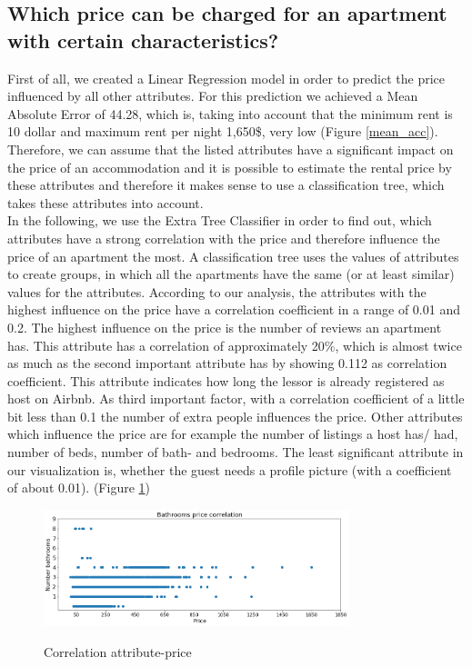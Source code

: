 \documentclass[journal]{IEEEtran}
\begin{document}
\subsection{Which price can be charged for an apartment with certain characteristics?}
First of all, we created a Linear Regression model in order to predict the price influenced by all other attributes. For this prediction we achieved a Mean Absolute Error of 44.28, which is, taking into account that the minimum rent is 10 dollar and maximum rent per night 1,650\$, very low (Figure \ref{mean_acc}). Therefore, we can assume that the listed attributes have a significant impact on the price of an accommodation and it is possible to estimate the rental price by these attributes and therefore it makes sense to use a classification tree, which takes these attributes into account.\\ In the following, we use the Extra Tree Classifier in order to find out, which attributes have a strong correlation with the price and therefore influence the price of an apartment the most. A classification tree uses the values of attributes to create groups, in which all the apartments have the same (or at least similar) values for the attributes. According to our analysis, the attributes with the highest influence on the price have a correlation coefficient in a range of 0.01 and 0.2. The highest influence on the price is the number of reviews an apartment has. This attribute has a correlation of approximately 20\%, which is almost twice as much as the second important attribute has by showing 0.112 as correlation coefficient. This attribute indicates how long the lessor is already registered as host on Airbnb. As third important factor, with a correlation coefficient of a little bit less than 0.1 the number of extra people influences the price. Other attributes which influence the price are for example the number of listings a host has/ had, number of beds, number of bath- and bedrooms. The least significant attribute in our visualization is, whether the guest needs a profile picture (with a coefficient of about 0.01). (Figure \ref{correlation-attribute-price})
\begin{figure}
  \begin{center}
  \includegraphics[width=3.5in]{photo/9_bathroom_price_correlation.png}\\
  \caption{Correlation attribute-price}\label{correlation-attribute-price}
  \end{center}
\end{figure}
\end{document}
